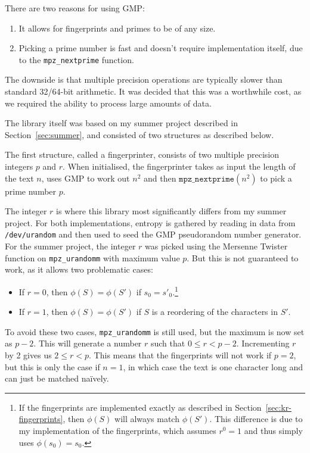 \documentclass[ %
                    author={Dominic Joseph Moylett},
                    degree={MEng},
                     title={Dictionary Matching with Fingerprints},
                  subtitle={An Empirical Analysis},
                      type={research},
                      year={2015} ]{dissertation}
\begin{document}
There are two reasons for using GMP:
\begin{enumerate}
  \item It allows for fingerprints and primes to be of any size.
  \item Picking a prime number is fast and doesn't require implementation itself, due to the \texttt{mpz\_nextprime} function.
\end{enumerate}

The downside is that multiple precision operations are typically slower than standard 32/64-bit arithmetic. It was decided that this was a worthwhile cost, as we required the ability to process large amounts of data.

The library itself was based on my summer project described in Section~\ref{sec:summer}, and consisted of two structures as described below.

The first structure, called a fingerprinter, consists of two multiple precision integers $p$ and $r$. When initialised, the fingerprinter takes as input the length of the text $n$, uses GMP to work out $n^2$ and then $\texttt{mpz\_nextprime}(n^2)$ to pick a prime number $p$.

The integer $r$ is where this library most significantly differs from my summer project. For both implementations, entropy is gathered by reading in data from \texttt{/dev/urandom} and then used to seed the GMP pseudorandom number generator. For the summer project, the integer $r$ was picked using the Mersenne Twister function on \texttt{mpz\_urandomm} with maximum value $p$. But this is not guaranteed to work, as it allows two problematic cases:

\begin{itemize}
  \item If $r = 0$, then $\phi(S) = \phi(S')$ if $s_0 = s'_0$.\footnote{If the fingerprints are implemented exactly as described in Section~\ref{sec:kr-fingerprints}, then $\phi(S)$ will always match $\phi(S')$. This difference is due to my implementation of the fingerprints, which assumes $r^0 = 1$ and thus simply uses $\phi(s_0) = s_0$.}
  \item If $r = 1$, then $\phi(S) = \phi(S')$ if $S$ is a reordering of the characters in $S'$.
\end{itemize}

To avoid these two cases, \texttt{mpz\_urandomm} is still used, but the maximum is now set as $p-2$. This will generate a number $r$ such that $0 \leq r < p-2$. Incrementing $r$ by 2 gives us $2 \leq r < p$. This means that the fingerprints will not work if $p = 2$, but this is only the case if $n = 1$, in which case the text is one character long and can just be matched na\"{i}vely.
\end{document}

